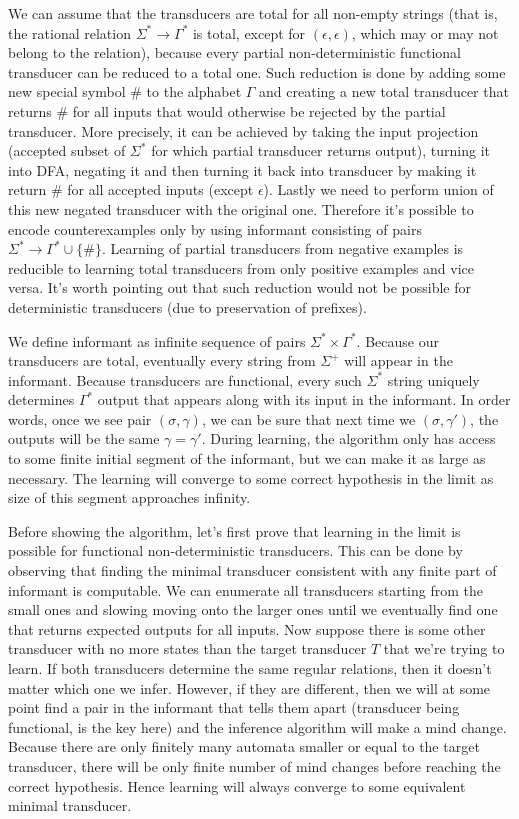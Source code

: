 We can assume that the transducers are total for all non-empty strings (that is, the rational relation $\Sigma^* \rightarrow \Gamma^*$ is total, except for $(\epsilon,\epsilon)$, which may or may not belong to the relation), because every partial non-deterministic functional transducer can be reduced to a total one. Such reduction is done by adding some new special symbol $\#$ to the alphabet $\Gamma$ and creating a new total transducer that returns $\#$ for all inputs that would otherwise be rejected by the partial transducer. More precisely, it can be achieved by taking the input projection (accepted subset of $\Sigma^*$ for which partial transducer returns output), turning it into DFA, negating it and then turning it back into transducer by making it return $\#$ for all accepted inputs (except $\epsilon$). Lastly we need to perform union of this new negated transducer with the original one. Therefore it's possible to encode counterexamples only by using informant consisting of pairs $\Sigma^* \rightarrow \Gamma^* \cup \{\#\}$. Learning of partial transducers from negative examples is reducible to learning total transducers from only positive examples and vice versa. It's worth pointing out that such reduction would not be possible for deterministic transducers (due to preservation of prefixes).

We define informant as infinite sequence of pairs $\Sigma^* \times \Gamma^*$. Because our transducers are total, eventually every string from $\Sigma^+$ will appear in the informant. Because transducers are functional, every such  $\Sigma^*$ string uniquely determines $\Gamma^*$ output that appears along with its input in the informant. In order words, once we see pair $(\sigma,\gamma)$, we can be sure that next time we $(\sigma,\gamma')$, the outputs will be the same $\gamma=\gamma'$. During learning, the algorithm only has access to some finite initial segment of the informant, but we can make it as large as necessary. The learning will converge to some correct hypothesis in the limit as size of this segment approaches infinity.

Before showing the algorithm, let's first prove that learning in the limit is possible for functional non-deterministic transducers. This can be done by observing that finding the minimal transducer consistent with any finite part of informant is computable. We can enumerate all transducers starting from the small ones and slowing moving onto the larger ones until we eventually find one that returns expected outputs for all inputs. Now suppose there is some other transducer with no more states than the target transducer $T$ that we're trying to learn. If both transducers determine the same regular relations, then it doesn't matter which one we infer. However, if they are different, then we will at some point find a pair in the informant that tells them apart (transducer being functional, is the key here) and the inference algorithm will make a mind change. Because there are only finitely many automata smaller or equal to the target transducer, there will be only finite number of mind changes before reaching the correct hypothesis. Hence learning will always converge to some equivalent minimal transducer.

